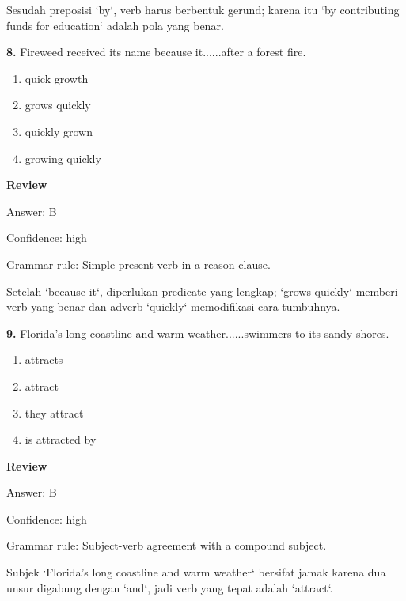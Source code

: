 \documentclass[12pt]{article}
\begin{document}
Sesudah preposisi `by`, verb harus berbentuk gerund; karena itu `by contributing funds for education` adalah pola yang benar.\par
\endgroup
\par
\vspace{0.25\baselineskip}
\noindent\textbf{8.} Fireweed received its name because it......after a forest fire.
\begin{enumerate}[label=(\Alph*),leftmargin=*,itemsep=0.2em]
\item quick growth
\item grows quickly
\item quickly grown
\item growing quickly
\end{enumerate}
\par
\begingroup
\setlength{\parskip}{0pt}
\setlength{\parindent}{0pt}
\textbf{Review}\par
Answer: B\par
Confidence: high\par
Grammar rule: Simple present verb in a reason clause.\par
Setelah `because it`, diperlukan predicate yang lengkap; `grows quickly` memberi verb yang benar dan adverb `quickly` memodifikasi cara tumbuhnya.\par
\endgroup
\par
\vspace{0.25\baselineskip}
\noindent\textbf{9.} Florida's long coastline and warm weather......swimmers to its sandy shores.
\begin{enumerate}[label=(\Alph*),leftmargin=*,itemsep=0.2em]
\item attracts
\item attract
\item they attract
\item is attracted by
\end{enumerate}
\par
\begingroup
\setlength{\parskip}{0pt}
\setlength{\parindent}{0pt}
\textbf{Review}\par
Answer: B\par
Confidence: high\par
Grammar rule: Subject-verb agreement with a compound subject.\par
Subjek `Florida's long coastline and warm weather` bersifat jamak karena dua unsur digabung dengan `and`, jadi verb yang tepat adalah `attract`.\par
\endgroup
\par
\vspace{0.25\baselineskip}
\end{document}

